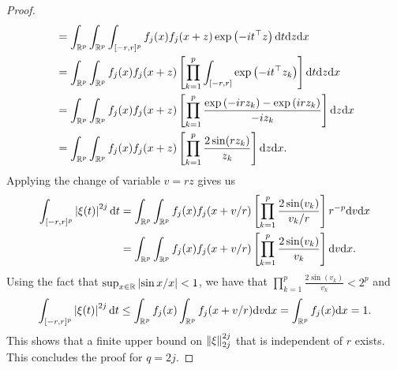 \begin{proof}
\begin{align*}
        &= \intRp{x}{\intRp{z}{\int_{[-r, r]^p} f_j(x)f_j(x + z)\expf{-it^\top z}\d t}}\\
        &= \intRp{x}{\intRp{z}{f_j(x)f_j(x + z)\left[\prod_{k=1}^p \int_{[-r, r]}\expf{-it^\top z_k}\right]\d t}}\\
        &= \intRp{x}{\intRp{z}{f_j(x)f_j(x + z)\left[\prod_{k=1}^p \frac{\expf{-irz_k} - \expf{irz_k}}{-iz_k} \right]}}\\
        &= \intRp{x}{\intRp{z}{f_j(x)f_j(x + z)\left[\prod_{k=1}^p \frac{2 \sin(rz_k)}{z_k} \right]}}.
    \end{align*}
    Applying the change of variable $v = r z$ gives us
    \begin{align*}
        \int_{[-r, r]^p} \abs{\xi(t)}^{2j} \d t
        &= \intRp{x}{\intRp{v}{f_j(x)f_j(x + v/r)\left[\prod_{k=1}^p \frac{2 \sin(v_k)}{v_k/r} \right] r^{-p}}}\\
        &= \intRp{x}{\intRp{v}{f_j(x)f_j(x + v/r)\left[\prod_{k=1}^p \frac{2 \sin(v_k)}{v_k} \right]}}.
    \end{align*}
    Using the fact that $\sup_{x \in \R} \abs{\sin x / x} < 1$, we have that $\prod_{k=1}^p \frac{2 \sin(v_k)}{v_k} < 2^p$ and
    \begin{equation*}
        \int_{[-r, r]^p} \abs{\xi(t)}^{2j} \d t
        \leq \intRp{x}{f_j(x)\intRp{v}{f_j(x + v/r)}}
        = \intRp{x}{f_j(x)} = 1.
    \end{equation*}
    This shows that a finite upper bound on $\norm{\xi}_{2j}^{2j}$ that is independent of $r$ exists. This concludes the proof for $q = 2j$.
\end{proof}